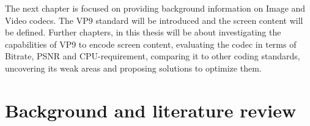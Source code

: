 \documentclass[a4paper,11pt,oneside]{article}
\begin{document}
\indent The next chapter is focused on providing background information on Image and Video codecs. The VP9 standard will be introduced and the screen content will be defined. Further chapters, in this thesis will be about investigating the capabilities of VP9 to encode screen content, evaluating the codec in terms of Bitrate, PSNR and CPU-requirement, comparing it to other coding standards, uncovering its weak areas and proposing solutions to optimize them.\\

\newpage
\section{Background and literature review}
\end{document}

